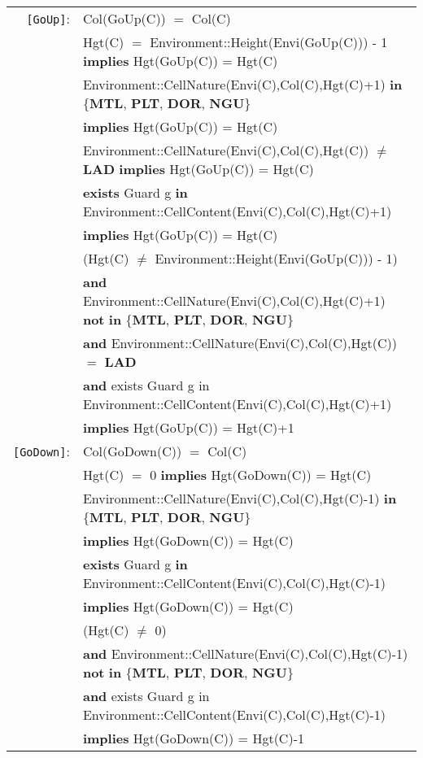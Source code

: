 \documentclass[7pt]{article}
\begin{document}
\begin{tabular}{rl}
\texttt{[GoUp]}: & \textrm{Col(GoUp(C))} $=$ \textrm{Col(C)}\\
& \textrm{Hgt(C)} $=$ Environment::Height(Envi(GoUp(C))) - 1 \textbf{implies} \textrm{Hgt(GoUp(C))} = \textrm{Hgt(C)} \\
& \textrm{Environment::CellNature(Envi(C),Col(C),Hgt(C)+1)} \textbf{in} \{\textbf{MTL}, \textbf{PLT}, \textbf{DOR}, \textbf{NGU}\} \\
& \quad \textbf{implies} \textrm{Hgt(GoUp(C))} = \textrm{Hgt(C)} \\
& \textrm{Environment::CellNature(Envi(C),Col(C),Hgt(C))} $\neq$ \textbf{LAD} \textbf{implies} \textrm{Hgt(GoUp(C))} = \textrm{Hgt(C)} \\
& \textbf{exists} \textrm{Guard} g \textbf{in} \textrm{Environment::CellContent(Envi(C),Col(C),Hgt(C)+1)} \\ & \quad\quad \textbf{implies} \textrm{Hgt(GoUp(C))} = \textrm{Hgt(C)}  \\
& (\textrm{Hgt(C)} $\neq$ Environment::Height(Envi(GoUp(C))) - 1) \\ 
&  \quad\quad \textbf{and} \textrm{Environment::CellNature(Envi(C),Col(C),Hgt(C)+1)} \textbf{not} \textbf{in} \{\textbf{MTL}, \textbf{PLT}, \textbf{DOR}, \textbf{NGU}\} \\ 
& \quad\quad  \textbf{and} \textrm{Environment::CellNature(Envi(C),Col(C),Hgt(C))} $=$ \textbf{LAD} \\
& \quad\quad  \textbf{and} {exists} \textrm{Guard} g {in} \textrm{Environment::CellContent(Envi(C),Col(C),Hgt(C)+1)} \\ & \quad\quad \textbf{implies} \textrm{Hgt(GoUp(C))} = \textrm{Hgt(C)}+1  \\

\texttt{[GoDown]}: & \textrm{Col(GoDown(C))} $=$ \textrm{Col(C)}\\
& \textrm{Hgt(C)} $=$ 0 \textbf{implies} \textrm{Hgt(GoDown(C))} = \textrm{Hgt(C)} \\
& \textrm{Environment::CellNature(Envi(C),Col(C),Hgt(C)-1)} \textbf{in} \{\textbf{MTL}, \textbf{PLT}, \textbf{DOR}, \textbf{NGU}\} \\
& \quad \textbf{implies} \textrm{Hgt(GoDown(C))} = \textrm{Hgt(C)} \\
& \textbf{exists} \textrm{Guard} g \textbf{in} \textrm{Environment::CellContent(Envi(C),Col(C),Hgt(C)-1)} \\ & \quad\quad \textbf{implies} \textrm{Hgt(GoDown(C))} = \textrm{Hgt(C)}  \\
& (\textrm{Hgt(C)} $\neq$ 0) \\ 
&  \quad\quad \textbf{and} \textrm{Environment::CellNature(Envi(C),Col(C),Hgt(C)-1)} \textbf{not} \textbf{in} \{\textbf{MTL}, \textbf{PLT}, \textbf{DOR}, \textbf{NGU}\} \\ 
& \quad\quad  \textbf{and} {exists} \textrm{Guard} g {in} \textrm{Environment::CellContent(Envi(C),Col(C),Hgt(C)-1)} \\ & \quad\quad \textbf{implies} \textrm{Hgt(GoDown(C))} = \textrm{Hgt(C)}-1  \\

\end{tabular}
\end{document}
